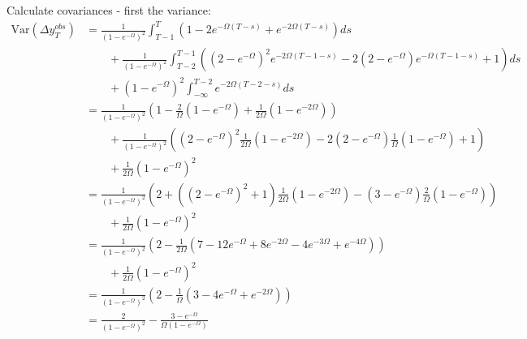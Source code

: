\documentclass[12pt,pdftex,letterpaper]{article}
\begin{document}
Calculate covariances - first the variance:
\begin{align*}
\mathrm{Var}(\Delta y_T^{obs}) &= \frac{1}{(1-e^{-\Omega})^2}\int_{T-1}^{T} ( 1 - 2e^{-\Omega (T-s)}  + e^{-2\Omega (T-s)}) ds \\
& \qquad + \frac{1}{(1-e^{-\Omega})^2} \int_{T-2}^{T-1}\left( (2-e^{-\Omega})^2 e^{-2\Omega (T-1-s)} -2(2-e^{-\Omega}) e^{-\Omega (T-1-s)} +1  \right)ds \\
& \qquad + (1-e^{-\Omega})^2 \int_{-\infty}^{T-2}  e^{-2\Omega (T-2-s)} ds \\
&= \frac{1}{(1-e^{-\Omega})^2}\left( 1 - \frac{2}{\Omega}(1-e^{-\Omega})    + \frac{1}{2\Omega}(1-e^{-2\Omega}) \right) \\
& \qquad + \frac{1}{(1-e^{-\Omega})^2}\left( (2-e^{-\Omega})^2\frac{1}{2\Omega}(1-e^{-2\Omega}) -2(2-e^{-\Omega}) \frac{1}{\Omega}(1-e^{-\Omega}) +1  \right) \\
& \qquad +  \frac{1}{2\Omega}(1-e^{-\Omega})^2 \\
&= \frac{1}{(1-e^{-\Omega})^2}\left( 2    + \left( (2-e^{-\Omega})^2 +1\right)\frac{1}{2\Omega}(1-e^{-2\Omega}) -(3-e^{-\Omega}) \frac{2}{\Omega}(1-e^{-\Omega})   \right) \\
& \qquad +  \frac{1}{2\Omega}(1-e^{-\Omega})^2 \\
&=  \frac{1}{(1-e^{-\Omega})^2}\left( 2   - \frac{1}{2\Omega}\left( 7 -12e^{-\Omega} +8e^{-2\Omega} -4e^{-3\Omega} + e^{-4\Omega} \right) \right) \\
& \qquad +  \frac{1}{2\Omega}(1-e^{-\Omega})^2 \\
&=  \frac{1}{(1-e^{-\Omega})^2}\left( 2   - \frac{1}{\Omega}\left( 3 -4e^{-\Omega} +e^{-2\Omega}  \right) \right)\\
&=  \frac{2}{(1-e^{-\Omega})^2}   - \frac{ 3 -e^{-\Omega}}{\Omega(1-e^{-\Omega})}
\end{align*}
\end{document}
